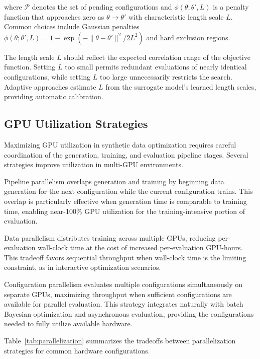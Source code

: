 where $\mathcal{P}$ denotes the set of pending configurations and $\phi(\theta; \theta', L)$ is a penalty function that approaches zero as $\theta \to \theta'$ with characteristic length scale $L$. Common choices include Gaussian penalties $\phi(\theta; \theta', L) = 1 - \exp(-\|\theta - \theta'\|^2 / 2L^2)$ and hard exclusion regions.

The length scale $L$ should reflect the expected correlation range of the objective function. Setting $L$ too small permits redundant evaluations of nearly identical configurations, while setting $L$ too large unnecessarily restricts the search. Adaptive approaches estimate $L$ from the surrogate model's learned length scales, providing automatic calibration.

\subsection{GPU Utilization Strategies}

Maximizing GPU utilization in synthetic data optimization requires careful coordination of the generation, training, and evaluation pipeline stages. Several strategies improve utilization in multi-GPU environments.

Pipeline parallelism overlaps generation and training by beginning data generation for the next configuration while the current configuration trains. This overlap is particularly effective when generation time is comparable to training time, enabling near-100\% GPU utilization for the training-intensive portion of evaluation.

Data parallelism distributes training across multiple GPUs, reducing per-evaluation wall-clock time at the cost of increased per-evaluation GPU-hours. This tradeoff favors sequential throughput when wall-clock time is the limiting constraint, as in interactive optimization scenarios.

Configuration parallelism evaluates multiple configurations simultaneously on separate GPUs, maximizing throughput when sufficient configurations are available for parallel evaluation. This strategy integrates naturally with batch Bayesian optimization and asynchronous evaluation, providing the configurations needed to fully utilize available hardware.

Table~\ref{tab:parallelization} summarizes the tradeoffs between parallelization strategies for common hardware configurations.


